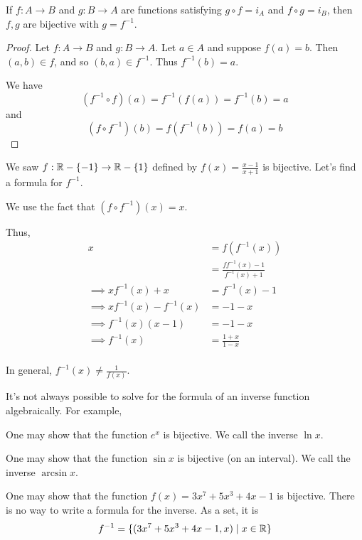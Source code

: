\documentclass{article}
\begin{document}
    \begin{theorem}
      If $f: A \to B$ and $g: B \to A$ are functions satisfying $g \circ f = i_A$ and $f \circ g = i_B$, then $f, g$ are bijective with $g = f^{-1}$.
    \end{theorem}
    \begin{proof}
      Let $f: A \to B$ and $g: B \to A$.
      Let $a \in A$ and suppose $f(a) = b$. Then $(a, b) \in f$, and so $(b, a) \in f^{-1}$. Thus $f^{-1}(b) = a$.

      We have \[
        (f^{-1} \circ f)(a) = f^{-1}(f(a)) = f^{-1}(b) = a
      \] and \[
        (f \circ f^{-1})(b) = f(f^{-1}(b)) = f(a) = b
      \]
    \end{proof}
    \begin{example}
      We saw $f: \mathbb{R} - \{-1\} \to \mathbb{R} - \{1\}$ defined by $f(x) = \frac{x-1}{x+1}$ is bijective. Let's find a formula for $f^{-1}$.

      We use the fact that $(f \circ f^{-1})(x) = x$.

      Thus,
      \begin{align*}
        x &= f(f^{-1}(x))\\
        &= \frac{ff^{-1}(x) - 1}{f^{-1}(x) + 1}\\
        \implies xf^{-1}(x) + x &= f^{-1}(x) - 1\\
        \implies xf^{-1}(x) - f^{-1}(x) &= -1 - x\\
        \implies f^{-1}(x)(x-1) &= -1 - x\\
        \implies f^{-1}(x) &= \frac{1+x}{1-x}\\
      \end{align*}
    \end{example}
    \begin{remark}
      In general, $f^{-1}(x) \neq \frac{1}{f(x)}$.
    \end{remark}
    \begin{remark}
      It's not always possible to solve for the formula of an inverse function algebraically. For example,

      One may show that the function $e^x$ is bijective. We call the inverse $\ln x$.

      One may show that the function $\sin x$ is bijective (on an interval). We call the inverse $\arcsin x$.

      One may show that the function $f(x) = 3x^7 + 5x^3 + 4x - 1$ is bijective. There is no way to write a formula for the inverse. As a set, it is
      \[
        f^{-1} = \{(3x^7 + 5x^3 + 4x - 1, x) \mid x \in \mathbb{R}\}
      \]
    \end{remark}
\end{document}
